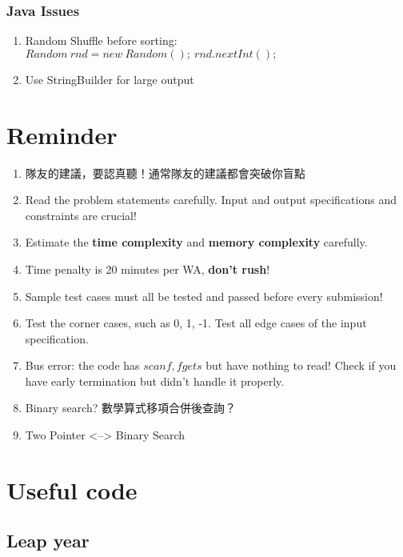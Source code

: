 \documentclass[10pt,oneside]{article}
\begin{document}
\begin{landscape}
\begin{multicols}{2}
\subsubsection{Java Issues}
\begin{enumerate}
	\item Random Shuffle before sorting: $Random\ rnd = new\ Random();\ rnd.nextInt();$
	\item Use StringBuilder for large output
\end{enumerate}


\section{Reminder}

\begin{enumerate}
	\item 隊友的建議，要認真聽！通常隊友的建議都會突破你盲點
	\item Read the problem statements carefully. Input and output specifications and constraints are crucial!
	\item Estimate the \textbf{time complexity} and \textbf{memory complexity} carefully.
	\item Time penalty is 20 minutes per WA, \textbf{don't rush}!
	\item Sample test cases must all be tested and passed before every submission!
	\item Test the corner cases, such as 0, 1, -1. Test all edge cases of the input specification.
	\item Bus error: the code has $scanf, fgets$ but have nothing to read! Check if you have early termination but didn't handle it properly.
	\item Binary search? 數學算式移項合併後查詢？
	\item Two Pointer <--> Binary Search
\end{enumerate}


\section{Useful code}

\subsection{Leap year}


\end{multicols}
\end{landscape}
\end{document}
